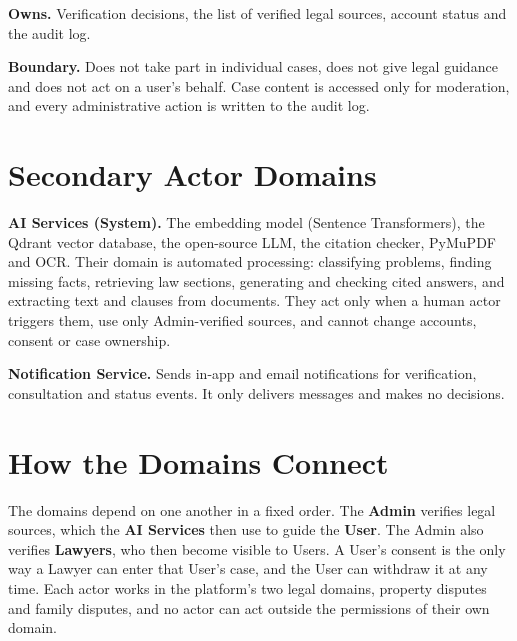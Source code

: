 \documentclass[11pt,a4paper]{article}
\begin{document}
\textbf{Owns.} Verification decisions, the list of verified legal sources, account status and the audit log.

\textbf{Boundary.} Does not take part in individual cases, does not give legal guidance and does not act on a user's behalf. Case content is accessed only for moderation, and every administrative action is written to the audit log.

\section{Secondary Actor Domains}
\textbf{AI Services (System).} The embedding model (Sentence Transformers), the Qdrant vector database, the open-source LLM, the citation checker, PyMuPDF and OCR. Their domain is automated processing: classifying problems, finding missing facts, retrieving law sections, generating and checking cited answers, and extracting text and clauses from documents. They act only when a human actor triggers them, use only Admin-verified sources, and cannot change accounts, consent or case ownership.

\textbf{Notification Service.} Sends in-app and email notifications for verification, consultation and status events. It only delivers messages and makes no decisions.

\section{How the Domains Connect}
The domains depend on one another in a fixed order. The \textbf{Admin} verifies legal sources, which the \textbf{AI Services} then use to guide the \textbf{User}. The Admin also verifies \textbf{Lawyers}, who then become visible to Users. A User's consent is the only way a Lawyer can enter that User's case, and the User can withdraw it at any time. Each actor works in the platform's two legal domains, property disputes and family disputes, and no actor can act outside the permissions of their own domain.
\end{document}
